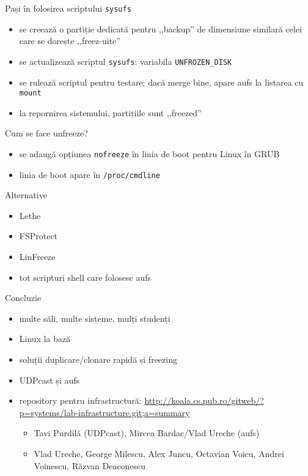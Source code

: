 \documentclass{simple}
\begin{document}
\begin{frame}{Pași în folosirea scriptului \texttt{sysufs}}
  \begin{itemize}
    \item se creează o partiție dedicată pentru ,,backup'' de dimensiune
      similară celei care se dorește ,,freez-uite''
    \item se actualizează scriptul \texttt{sysufs}: variabila
      \texttt{UNFROZEN\_DISK}
    \item se rulează scriptul pentru testare; dacă merge bine, apare aufs la
      listarea cu \texttt{mount}
    \item la repornirea sistemului, partițiile sunt ,,freezed''
  \end{itemize}
\end{frame}

\begin{frame}{Cum se face unfreeze?}
  \begin{itemize}
    \item se adaugă opțiunea \texttt{nofreeze} în linia de boot pentru Linux
      în GRUB
    \item linia de boot apare în \texttt{/proc/cmdline}
  \end{itemize}
\end{frame}

\begin{frame}{Alternative}
  \begin{itemize}
    \item Lethe
    \item FSProtect
    \item LinFreeze
    \item tot scripturi shell care folosesc aufs
  \end{itemize}
\end{frame}

\begin{frame}{Concluzie}
  \begin{itemize}
    \item multe săli, multe sisteme, mulți studenți
    \item Linux la bază
    \item soluții duplicare/clonare rapidă și freezing
    \item UDPcast și aufs
    \item repository pentru infrastructură: \url{http://koala.cs.pub.ro/gitweb/?p=systems/lab-infrastructure.git;a=summary}
      \begin{itemize}
        \item Tavi Purdilă (UDPcast), Mircea Bardac/Vlad Ureche (aufs)
        \item Vlad Ureche, George Milescu, Alex Juncu, Octavian Voicu, Andrei
          Voinescu, Răzvan Deaconescu
      \end{itemize}
  \end{itemize}
\end{frame}
\end{document}
